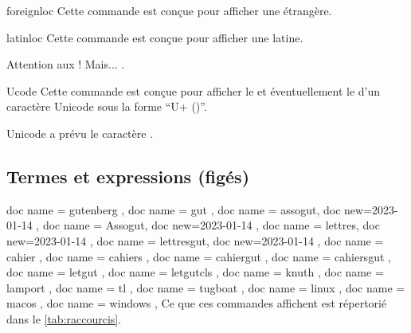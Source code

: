 \documentclass{letgut}
\begin{document}
\begin{docCommand}{foreignloc}{}
  Cette commande est conçue pour afficher une  étrangère.
\end{docCommand}

\begin{docCommand}{latinloc}{}
  Cette commande est conçue pour afficher une  latine.
\end{docCommand}

\begin{ltx-code-result}[title addon=locutions étrangères,listing options app={deletekeywords={[3]{options}}}]
Attention aux  !
Mais... .
\end{ltx-code-result}

\begin{docCommand}{Ucode}{}
  Cette commande est conçue pour afficher le  et
  éventuellement le  d'un caractère Unicode sous la forme
  \enquote{U+ ()}.
\end{docCommand}

\begin{ltx-code-result}[title addon=Point de code d'un caractère Unicode,listing options app={deletekeywords={[3]{options}}}]
Unicode a prévu le caractère .
\end{ltx-code-result}

\subsection{Termes et expressions (figés)}
\label{sec:termes}

\begin{docCommands}
  {
    { doc name = gutenberg },
    { doc name = gut },
    { doc name = assogut, doc new={2023-01-14} },
    { doc name = Assogut, doc new={2023-01-14} },
    { doc name = lettres, doc new={2023-01-14} },
    { doc name = lettresgut, doc new={2023-01-14} },
    { doc name = cahier },
    { doc name = cahiers },
    { doc name = cahiergut },
    { doc name = cahiersgut },
    { doc name = letgut },
    { doc name = letgutcls },
    { doc name = knuth },
    { doc name = lamport },
    { doc name = tl },
    { doc name = tugboat },
    { doc name = linux },
    { doc name = macos },
    { doc name = windows },
  }
  Ce que ces commandes affichent est répertorié dans le \vref{tab:raccourcis}.
\end{docCommands}
\end{document}
